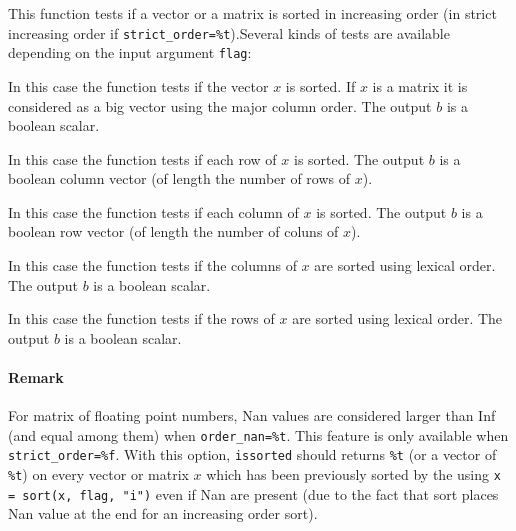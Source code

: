 \begin{mandescription}
This function tests if a vector or a matrix is sorted in increasing order 
(in strict increasing order if \verb+strict_order=%t+).Several  kinds of tests are available 
depending on the input argument \verb+flag+:

 In this case the function tests if  the vector $x$  is sorted. 
If $x$ is a matrix it is considered as a big vector using the
 major column order. The output $b$ is a boolean scalar.

 In this case the function tests if each row of $x$ is sorted. The output
$b$ is a boolean column vector (of length the number of rows of $x$).

 In this case the function tests if each column of $x$ is sorted. The output
$b$ is a boolean row vector (of length the number of coluns of $x$).

 In this case the function tests if the columns of $x$ are sorted using lexical order.
The output $b$ is a boolean scalar.

 In this case the function tests if the rows of $x$ are sorted using lexical order.
The output $b$ is a boolean scalar.


\paragraph{Remark}

For matrix of floating point numbers, Nan values are considered larger
than Inf (and equal among them) when \verb+order_nan=%t+. This feature
is only available when \verb+strict_order=%f+. With this option, 
\verb+issorted+ should returns \verb+%t+ (or a vector of \verb+%t+) on every
vector or matrix $x$ which has been previously sorted by the 
using \verb+x = sort(x, flag, "i")+ even if Nan are present (due to the fact
that sort places Nan value at the end for an increasing order sort).

\end{mandescription}

